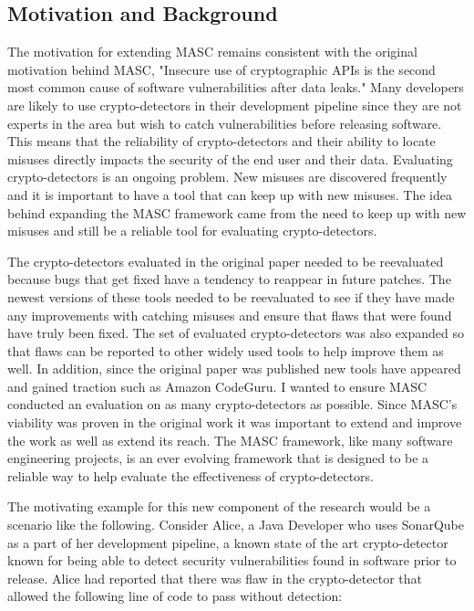 \subsection{Motivation and Background}
\label{ch1:subsec:motivation}

The motivation for extending MASC remains consistent with the original motivation behind MASC, "Insecure use of cryptographic APIs is the second most common cause of software vulnerabilities after data leaks." Many developers are likely to use crypto-detectors in their development pipeline since they are not experts in the area but wish to catch vulnerabilities before releasing software. This means that the reliability of crypto-detectors and their ability to locate misuses directly impacts the security of the end user and their data. Evaluating crypto-detectors is an ongoing problem. New misuses are discovered frequently and it is important to have a tool that can keep up with new misuses. The idea behind expanding the MASC framework came from the need to keep up with new misuses and still be a reliable tool for evaluating crypto-detectors. 

The crypto-detectors evaluated in the original paper needed to be reevaluated because bugs that get fixed have a tendency to reappear in future patches.\cite{bkm+18} The newest versions of these tools needed to be reevaluated to see if they have made any improvements with catching misuses and ensure that flaws that were found have truly been fixed. The set of evaluated crypto-detectors was also expanded so that flaws can be reported to other widely used tools to help improve them as well. In addition, since the original paper was published new tools have appeared and gained traction such as Amazon CodeGuru. I wanted to ensure MASC conducted an evaluation on as many crypto-detectors as possible. Since MASC's viability was proven in the original work it was important to extend and improve the work as well as extend its reach. The MASC framework, like many software engineering projects, is an ever evolving framework that is designed to be a reliable way to help evaluate the effectiveness of crypto-detectors.

The motivating example for this new component of the research would be a scenario like the following. Consider Alice, a Java Developer who uses SonarQube as a part of her development pipeline, a known state of the art crypto-detector known for being able to detect security vulnerabilities found in software prior to release. Alice had reported that there was flaw in the crypto-detector that allowed the following line of code to pass without detection:

